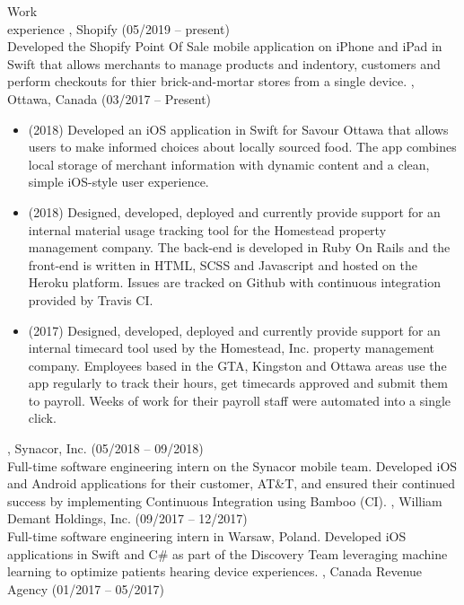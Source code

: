 \documentclass{resume}
\begin{document}
\begin{category}{Work \\experience}
, Shopify (05/2019 -- present)\\
Developed the Shopify Point Of Sale mobile application on iPhone and iPad in Swift that 
allows merchants to manage products and indentory, customers and perform checkouts for 
thier brick-and-mortar stores from a single device. 
, Ottawa, Canada (03/2017 -- Present)
\begin{itemize}
  \item (2018) Developed an iOS application in Swift for Savour Ottawa that allows
    users to make informed choices about locally sourced food. The app combines
    local storage of merchant information with dynamic content and a clean,
    simple iOS-style user experience.
  \item (2018) Designed, developed, deployed and currently provide support for an
    internal material usage tracking tool for the Homestead property management 
    company. The back-end is developed in Ruby On Rails and the front-end is written 
    in HTML, SCSS and Javascript and hosted on the Heroku platform. Issues are tracked
    on Github with continuous integration provided by Travis CI.
  \item (2017) Designed, developed, deployed and currently provide support for an
    internal timecard tool used by the Homestead, Inc. property management company.
    Employees based in the GTA, Kingston and Ottawa areas use the app regularly to
    track their hours, get timecards approved and submit them to payroll.
    Weeks of work for their payroll staff were automated into a single click.
  \end{itemize}
, Synacor, Inc. (05/2018 -- 09/2018)\\
Full-time software engineering intern on the Synacor mobile team.
Developed iOS and Android applications for their customer, AT\&T, and ensured
their continued success by implementing Continuous Integration using Bamboo (CI).
, William Demant Holdings, Inc. (09/2017 -- 12/2017)\\
Full-time software engineering intern in Warsaw, Poland.
Developed iOS applications in Swift and C\# as part of the Discovery Team leveraging machine
learning to optimize patients hearing device experiences.
, Canada Revenue Agency (01/2017 -- 05/2017)\\

\end{category}
\end{document}
